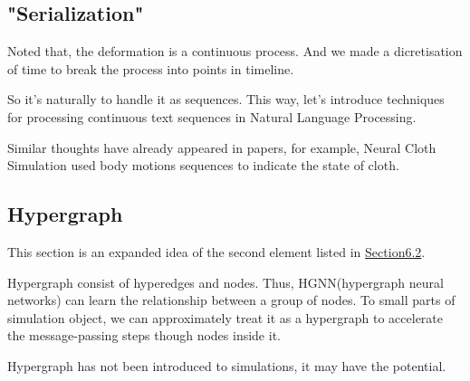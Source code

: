 \documentclass{article}
\begin{document}
\subsection{"Serialization"}
\par Noted that, the deformation is a continuous process. And we made a dicretisation of time to break the process into points in timeline.
\par So it's naturally to handle it as sequences. This way, let's introduce techniques for processing continuous text sequences in Natural Language Processing.
\par Similar thoughts have already appeared in papers, for example, Neural Cloth Simulation\cite{bertiche2022neural} used body motions sequences to indicate the state of cloth.
\subsection{Hypergraph}
\par This section is an expanded idea of the second element listed in \href{subsection.6.2}{Section6.2}.
\par Hypergraph consist of hyperedges and nodes. Thus, HGNN(hypergraph neural networks) can learn the relationship between a group of nodes. To small parts of simulation object, we can approximately treat it as a hypergraph to accelerate the message-passing steps though nodes inside it.
\par Hypergraph has not been introduced to simulations, it may have the potential.

\newpage


\end{document}
